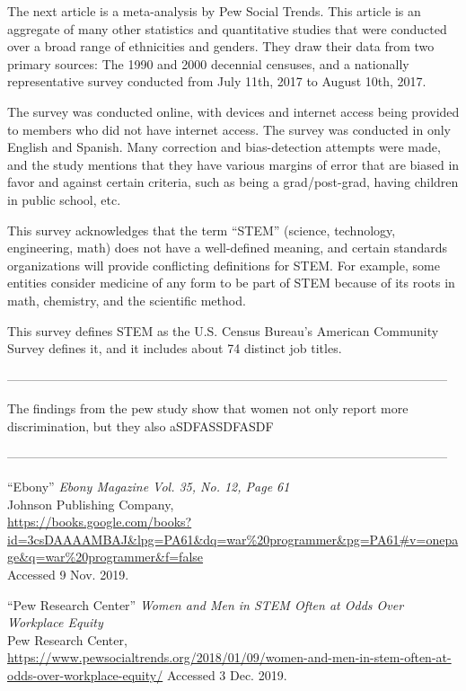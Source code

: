\documentclass[a4paper,12pt]{article}
\begin{document}
The next article\cite{pew} is a meta-analysis %
by Pew Social Trends. This article is an aggregate of many other statistics and quantitative studies that were conducted over a broad range of ethnicities and genders. They draw their data from two primary sources: The 1990 and 2000 decennial censuses, and a nationally representative %
survey conducted from July 11th, 2017 to August 10th, 2017. 

	The survey was conducted online, with devices and internet access being provided to members who did not have internet access. The survey was conducted in only English and Spanish. Many correction and bias-detection attempts were made, and the study mentions that they have various margins of error that are biased in favor and against certain criteria, such as being a grad/post-grad, having children in public school, etc.

	This survey acknowledges that the term ``STEM'' (science, technology, engineering, math) does not have a well-defined meaning, and certain standards organizations will provide conflicting definitions for STEM. For example, some entities consider medicine of any form to be part of STEM because of its roots in math, chemistry, and the scientific method.

	This survey %
defines STEM as the  U.S. Census Bureau’s American Community Survey defines it, and it includes about 74 distinct job titles.

---------------------------------------------------------------------------------------------------------

The findings from the pew study show that women not only report more discrimination, but they also
aSDFASSDFASDF

---------------------------------------------------------------------------------------------------------

\newpage
\singlespacing

\begin{thebibliography}{9}

``Ebony'' \textit{Ebony Magazine Vol. 35, No. 12, Page 61}\\
Johnson Publishing Company, \\
\url{https://books.google.com/books?id=3csDAAAAMBAJ&lpg=PA61&dq=war%20programmer&pg=PA61#v=onepage&q=war%20programmer&f=false}  \\
Accessed 9 Nov. 2019.

``Pew Research Center'' \textit{Women and Men in STEM Often at Odds Over Workplace Equity} \\
Pew Research Center,\\
\url{https://www.pewsocialtrends.org/2018/01/09/women-and-men-in-stem-often-at-odds-over-workplace-equity/}
Accessed 3 Dec. 2019.

\end{thebibliography}

\newpage

\end{document}
